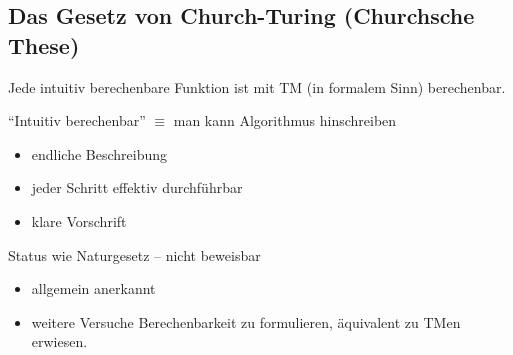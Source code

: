 \subsection{Das Gesetz von Church-Turing (Churchsche These)} %
\begin{Satz}[name={[Intuitiv berechenbare Funktionen sind mit \acs*{TM} berechenbar]}]
	Jede intuitiv berechenbare Funktion ist mit \ac{TM} (in formalem Sinn) berechenbar.
	
	"`Intuitiv berechenbar"' $\equiv$ man kann Algorithmus hinschreiben
	\begin{itemize}
		\item endliche Beschreibung
		\item jeder Schritt effektiv durchführbar
		\item klare Vorschrift
	\end{itemize}
	Status wie Naturgesetz -- nicht beweisbar
	\begin{itemize}[label=\->]
		\item allgemein anerkannt
		\item weitere Versuche Berechenbarkeit zu formulieren, äquivalent zu \ac{TM}en erwiesen.
	\end{itemize}
\end{Satz}